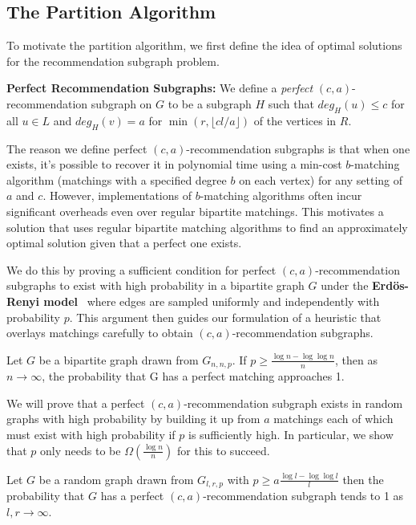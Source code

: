 \subsection{The Partition Algorithm}
To motivate the partition algorithm, we first define the idea of optimal solutions for the recommendation subgraph problem.
\vs

{\bf Perfect Recommendation Subgraphs:} We define a \emph{perfect} $(c,a)$-recommendation subgraph on $G$ to be a subgraph $H$ such that
$deg_H(u)\leq c$ for all $u\in L$ and $deg_H(v)=a$ for
$\min(r,\lfloor cl/a \rfloor)$ of the vertices in $R$.
\vs

The reason we define perfect $(c,a)$-recommendation subgraphs is that when one
exists, it's possible to recover it in polynomial time using a min-cost
$b$-matching algorithm (matchings with a specified degree $b$ on each vertex)
for any setting of $a$ and $c$. However, implementations of $b$-matching
algorithms often incur significant overheads even over regular bipartite matchings.
This motivates a solution that uses regular bipartite matching algorithms to find
an approximately optimal solution given that a perfect one exists. \vs

We do this by proving a sufficient condition for perfect $(c,a)$-recommendation
subgraphs to exist with high probability in a bipartite graph $G$ under the
{\bf Erd\"os-Renyi model}~\cite{ErdosRenyi59} where edges are sampled uniformly and
independently with probability $p$. This argument then guides our formulation of
a heuristic that overlays matchings carefully to obtain $(c,a)$-recommendation
subgraphs. \vs

\begin{thm}\cite{Janson2011}
\label{random_matching_threshold}
Let $G$ be a bipartite graph drawn from $G_{n, n, p}$. If $p \geq \frac{\log n -
\log\log n}{n}$, then as $n\to\infty$,  the probability that G has a perfect
    matching approaches 1.
\end{thm}

We will prove that a perfect $(c,a)$-recommendation subgraph exists in
random graphs with high probability by building it up from $a$
matchings each of which must exist with high probability if $p$ is
sufficiently high. In particular, we show that $p$ only needs to
be $\Omega(\frac{\log n}{n})$ for this to succeed.

\begin{thm}\label{perfect}
Let $G$ be a random graph drawn from $G_{l, r, p}$ with $p\geq a\frac{\log l-\log\log
l}{l}$ then the probability that $G$ has a perfect $(c, a)$-recommendation
subgraph tends to 1 as $l,r\to\infty$.
\end{thm}

